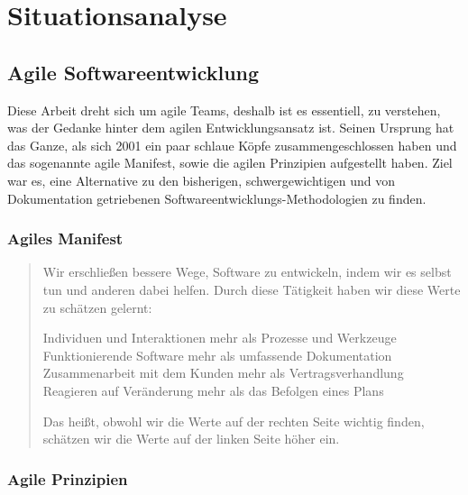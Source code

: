 \chapter{Situationsanalyse}

\section{Agile Softwareentwicklung}

Diese Arbeit dreht sich um agile Teams, deshalb ist es essentiell, zu verstehen, was der Gedanke hinter dem agilen Entwicklungsansatz ist.
Seinen Ursprung hat das Ganze, als sich 2001 ein paar schlaue Köpfe zusammengeschlossen haben und das sogenannte agile Manifest, sowie die agilen Prinzipien aufgestellt haben.
Ziel war es, eine Alternative zu den bisherigen, schwergewichtigen und von Dokumentation getriebenen Softwareentwicklungs-Methodologien zu finden.

\subsection{Agiles Manifest}

\begin{quote}Wir erschließen bessere Wege, Software zu entwickeln,
indem wir es selbst tun und anderen dabei helfen.
Durch diese Tätigkeit haben wir diese Werte zu schätzen gelernt:

Individuen und Interaktionen mehr als Prozesse und Werkzeuge
Funktionierende Software mehr als umfassende Dokumentation
Zusammenarbeit mit dem Kunden mehr als Vertragsverhandlung
Reagieren auf Veränderung mehr als das Befolgen eines Plans

Das heißt, obwohl wir die Werte auf der rechten Seite wichtig finden,
schätzen wir die Werte auf der linken Seite höher ein.\end{quote}\cite{agile_manifest}

\subsection{Agile Prinzipien}

